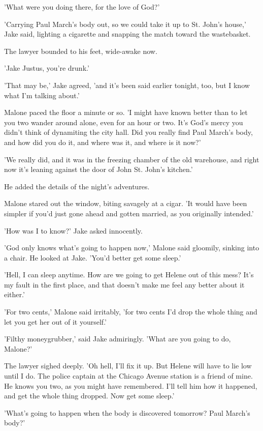 \documentclass{novel}
\begin{document}
'What were you doing there, for the love of God?'

'Carrying Paul March’s body out, so we could take it up to St. John’s house,' Jake said, lighting a cigarette and snapping the match toward the wastebasket.

The lawyer bounded to his feet, wide-awake now.

'Jake Justus, you’re drunk.'

'That may be,' Jake agreed, 'and it’s been said earlier tonight, too, but I know what I’m talking about.'

Malone paced the floor a minute or so. 'I might have known better than to let you two wander around alone, even for an hour or two. It’s God’s mercy you didn’t think of dynamiting the city hall. Did you really find Paul March’s body, and how did you do it, and where was it, and where is it now?'

'We really did, and it was in the freezing chamber of the old warehouse, and right now it’s leaning against the door of John St. John’s kitchen.'

He added the details of the night’s adventures.

Malone stared out the window, biting savagely at a cigar. 'It would have been simpler if you’d just gone ahead and gotten married, as you originally intended.'

'How was I to know?' Jake asked innocently.

'God only knows what’s going to happen now,' Malone said gloomily, sinking into a chair. He looked at Jake. 'You’d better get some sleep.'

'Hell, I can sleep anytime. How are we going to get Helene out of this mess? It’s my fault in the first place, and that doesn’t make me feel any better about it either.'

'For two cents,' Malone said irritably, 'for two cents I’d drop the whole thing and let you get her out of it yourself.'

'Filthy moneygrubber,' said Jake admiringly. 'What are you going to do, Malone?'

The lawyer sighed deeply. 'Oh hell, I’ll fix it up. But Helene will have to lie low until I do. The police captain at the Chicago Avenue station is a friend of mine. He knows you two, as you might have remembered. I’ll tell him how it happened, and get the whole thing dropped. Now get some sleep.'

'What’s going to happen when the body is discovered tomorrow? Paul March’s body?'
\end{document}

